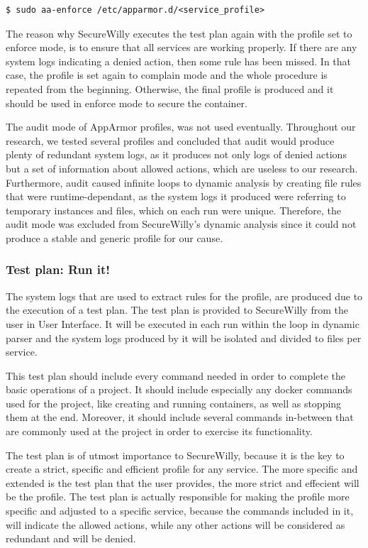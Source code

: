 \begin{lstlisting}[style=dockercommands]
$ sudo aa-enforce /etc/apparmor.d/<service_profile>
\end{lstlisting}

The reason why SecureWilly executes the test plan again with the profile set to enforce mode, is to ensure that all services are working properly. If there are any system logs indicating a denied action, then some rule has been missed. In that case, the profile is set again to complain mode and the whole procedure is repeated from the beginning. Otherwise, the final profile is produced and it should be used in enforce mode to secure the container.

The audit mode of AppArmor profiles, was not used eventually. Throughout our research, we tested several profiles and concluded that audit would produce plenty of redundant system logs, as it produces not only logs of denied actions but a set of information about allowed actions, which are useless to our research. Furthermore, audit caused infinite loops to dynamic analysis by creating file rules that were runtime-dependant, as the system logs it produced were referring to temporary instances and files, which on each run were unique. Therefore, the audit mode was excluded from SecureWilly's dynamic analysis since it could not produce a stable and generic profile for our cause.

\subsubsection{Test plan: Run it!}
The system logs that are used to extract rules for the profile, are produced due to the execution of a test plan. The test plan is provided to SecureWilly from the user in User Interface. It will be executed in each run within the loop in dynamic parser and the system logs produced by it will be isolated and divided to files per service.

This test plan should include every command needed in order to complete the basic operations of a project. It should include especially any docker commands used for the project, like creating and running containers, as well as stopping them at the end. Moreover, it should include several commands in-between that are commonly used at the project in order to exercise its functionality.

The test plan is of utmost importance to SecureWilly, because it is the key to create a strict, specific and efficient profile for any service. The more specific and extended is the test plan that the user provides, the more strict and effecient will be the profile. The test plan is actually responsible for making the profile more specific and adjusted to a specific service, because the commands included in it, will indicate the allowed actions, while any other actions will be considered as redundant and will be denied.

